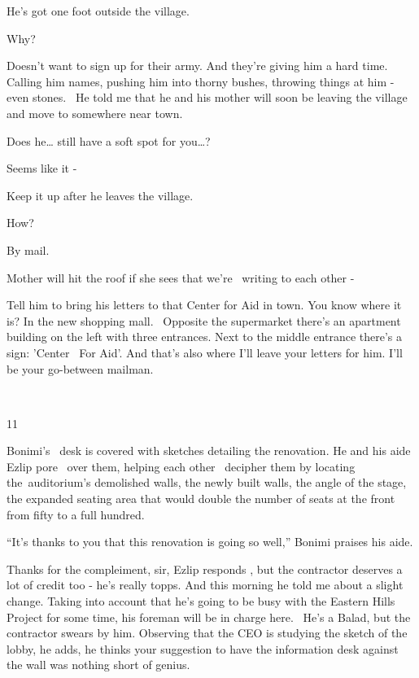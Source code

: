 \documentclass[letterpaper]{article}
\begin{document}
{\textquotedbl}He's got one foot outside the village.{\textquotedbl} 

{\textquotedbl}Why?{\textquotedbl}

{\textquotedbl}Doesn't want to sign up for their army. And they're giving him a hard time. Calling him names, pushing
him into thorny bushes, throwing things at him - even stones. ~He told me that he and his mother will soon be leaving
the village and move to somewhere near town.{\textquotedbl} 

{\textquotedbl}Does he{\dots} still have a soft spot for you{\dots}?{\textquotedbl} 

{\textquotedbl}Seems like it -{\textquotedbl} 

{\textquotedbl}Keep it up after he leaves the village.{\textquotedbl} 

{\textquotedbl}How?{\textquotedbl} 

{\textquotedbl}By mail.{\textquotedbl} 

{\textquotedbl}Mother will hit the roof if she sees that we're \ writing to each other -{\textquotedbl} 

{\textquotedbl}Tell him to bring his letters to that Center for Aid in town. You know where it is? In the new shopping
mall. \ Opposite the supermarket there's an apartment building on the left with three entrances. Next to the middle
entrance there's a sign: 'Center \ For Aid'. And that's also where I'll leave your letters for him. I'll be your
go-between mailman.{\textquotedbl} 

~

11 

Bonimi's ~desk is covered{ }with sketches detailing the renovation. He and his aide Ezlip pore \ over
them, helping each other ~decipher them by locating the~auditorium's demolished walls, the newly built walls, the angle
of the stage, the expanded seating area that would double the number of seats at the front from fifty to a
full{ }hundred.~ 

{}``It's thanks to you that this renovation is going so well,'' Bonimi{ }praises his aide.

{\textquotedbl}Thanks for the compleiment, sir,{\textquotedbl} Ezlip responds , {\textquotedbl}but the contractor
deserves a lot of credit too - he's really topps. And this morning he told me about a slight change. Taking into
account that he's going to be busy with the Eastern Hills Project for some time, his foreman will be in charge here.
~He's a Balad, but the contractor swears{ }by him.{\textquotedbl} Observing that the CEO is studying the
sketch of the lobby, he adds, {\textquotedbl}he thinks your suggestion to{ }have the information desk
against the wall was nothing short of genius.{\textquotedbl} 
\end{document}
